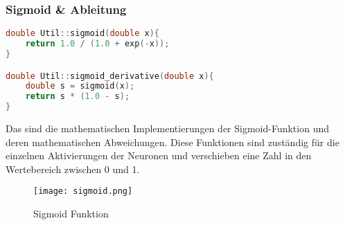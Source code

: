 \subsubsection{Sigmoid \& Ableitung}
\label{sec:RealSigmoidAbleitungCode}
\begin{lstlisting}[language=C++]
double Util::sigmoid(double x){
	return 1.0 / (1.0 + exp(-x));
}

double Util::sigmoid_derivative(double x){
	double s = sigmoid(x);
	return s * (1.0 - s);
}
\end{lstlisting}
Das sind die mathematischen Implementierungen der Sigmoid-Funktion und deren mathematischen Abweichungen. Diese Funktionen sind zuständig für die einzelnen Aktivierungen der Neuronen und verschieben eine Zahl in den Wertebereich zwischen 0 und 1.
\begin{figure}[H]
	\centering
		\texttt{[image: sigmoid.png]}
		\caption{Sigmoid Funktion}
	\label{fig:sigmoid}
\end{figure}

